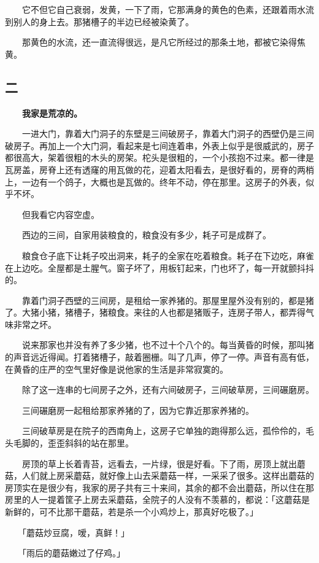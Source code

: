 \documentclass[UTF8]{ctexart}
\begin{document}
　　它不但它自己衰弱，发黄，一下了雨，它那满身的黄色的色素，还跟着雨水流到别人的身上去。那猪槽子的半边已经被染黄了。

　　那黄色的水流，还一直流得很远，是凡它所经过的那条土地，都被它染得焦黄。

\subsection{二}

　　\textbf{我家是荒凉的。}

　　一进大门，靠着大门洞子的东壁是三间破房子，靠着大门洞子的西壁仍是三间破房子。再加上一个大门洞，看起来是七间连着串，外表上似乎是很威武的，房子都很高大，架着很粗的木头的房架。柁头是很粗的，一个小孩抱不过来。都一律是瓦房盖，房脊上还有透窿的用瓦做的花，迎着太阳看去，是很好看的，房脊的两梢上，一边有一个鸽子，大概也是瓦做的。终年不动，停在那里。这房子的外表，似乎不坏。

　　但我看它内容空虚。

　　西边的三间，自家用装粮食的，粮食没有多少，耗子可是成群了。

　　粮食仓子底下让耗子咬出洞来，耗子的全家在吃着粮食。耗子在下边吃，麻雀在上边吃。全屋都是土腥气。窗子坏了，用板钉起来，门也坏了，每一开就颤抖抖的。

　　靠着门洞子西壁的三间房，是租给一家养猪的。那屋里屋外没有别的，都是猪了。大猪小猪，猪槽子，猪粮食。来往的人也都是猪贩子，连房子带人，都弄得气味非常之坏。

　　说来那家也并没有养了多少猪，也不过十个八个的。每当黄昏的时候，那叫猪的声音远近得闻。打着猪槽子，敲着圈栅。叫了几声，停了一停。声音有高有低，在黄昏的庄严的空气里好像是说他家的生活是非常寂寞的。

　　除了这一连串的七间房子之外，还有六间破房子，三间破草房，三间碾磨房。

　　三间碾磨房一起租给那家养猪的了，因为它靠近那家养猪的。

　　三间破草房是在院子的西南角上，这房子它单独的跑得那么远，孤伶伶的，毛头毛脚的，歪歪斜斜的站在那里。

　　房顶的草上长着青苔，远看去，一片绿，很是好看。下了雨，房顶上就出蘑菇，人们就上房采蘑菇，就好像上山去采蘑菇一样，一采采了很多。这样出蘑菇的房顶实在是很少有，我家的房子共有三十来间，其余的都不会出蘑菇，所以住在那房里的人一提着筐子上房去采蘑菇，全院子的人没有不羡慕的，都说：「这蘑菇是新鲜的，可不比那干蘑菇，若是杀一个小鸡炒上，那真好吃极了。」

　　「蘑菇炒豆腐，嗳，真鲜！」

　　「雨后的蘑菇嫩过了仔鸡。」
\end{document}
